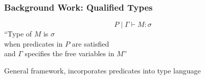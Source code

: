 


\begin{frame}[c]
  \frametitle{Background Work: Qualified Types}
  \begin{center}
    {\LARGE   $$P \mid \Gamma \vdash M:\sigma $$}
``Type of $M$ is $\sigma$\\
  when predicates in $P$ are satisfied\\
  and $\Gamma$ specifies the free variables in $M$''\cite{jones_theory_1994}

  General framework, incorporates predicates into type language
  \end{center}
\end{frame}

